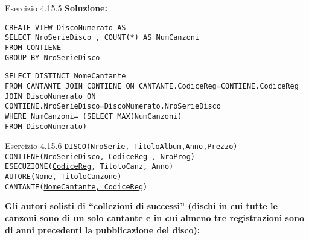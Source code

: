 \begin{frame}{Esercizio 4.15.5}
    \textbf{Soluzione:}
    \vspace{1em}
    
    \texttt{CREATE VIEW DiscoNumerato AS\\ SELECT NroSerieDisco , COUNT(*) AS NumCanzoni
\\FROM CONTIENE\\GROUP BY NroSerieDisco}
\vspace{1em}

    \texttt{SELECT DISTINCT NomeCantante\\FROM CANTANTE JOIN CONTIENE ON CANTANTE.CodiceReg=CONTIENE.CodiceReg\\JOIN DiscoNumerato ON
CONTIENE.NroSerieDisco=DiscoNumerato.NroSerieDisco\\WHERE NumCanzoni= (SELECT MAX(NumCanzoni)\\ \hspace{9.5em}FROM DiscoNumerato)}
    \end{frame}
\begin{frame}{Esercizio 4.15.6}
    \texttt{DISCO(\underline{NroSerie}, TitoloAlbum,Anno,Prezzo)\\
    CONTIENE(\underline{NroSerieDisco, CodiceReg} , NroProg)\\
    ESECUZIONE(\underline{CodiceReg}, TitoloCanz, Anno)\\
    AUTORE(\underline{Nome, TitoloCanzone})\\
    CANTANTE(\underline{NomeCantante, CodiceReg})}
    \vspace{1em}
    
    \textbf{Gli autori solisti di ``collezioni di successi'' (dischi in cui tutte le canzoni sono di un solo cantante e in cui almeno tre registrazioni sono di anni precedenti la pubblicazione del disco);}
\end{frame}

